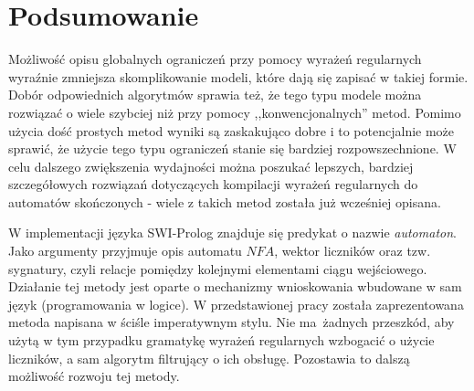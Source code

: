 \chapter{Podsumowanie}
\thispagestyle{chapterBeginStyle}

\par
Możliwość opisu globalnych ograniczeń przy pomocy wyrażeń regularnych wyraźnie zmniejsza skomplikowanie modeli, które
dają się zapisać w takiej formie. Dobór odpowiednich algorytmów sprawia też, że tego typu modele można rozwiązać o wiele
szybciej niż przy pomocy ,,konwencjonalnych'' metod. Pomimo użycia dość prostych metod wyniki są zaskakująco dobre i to
potencjalnie może sprawić, że użycie tego typu ograniczeń stanie się bardziej rozpowszechnione. W celu dalszego zwiększenia
wydajności można poszukać lepszych, bardziej szczegółowych rozwiązań dotyczących kompilacji wyrażeń regularnych do automatów
skończonych - wiele z takich metod została już wcześniej opisana.
\par
W implementacji języka SWI-Prolog znajduje się predykat o nazwie \textit{automaton}. Jako argumenty przyjmuje opis automatu $NFA$,
wektor liczników oraz tzw. sygnatury, czyli relacje pomiędzy kolejnymi elementami ciągu wejściowego. Działanie tej metody
jest oparte o mechanizmy wnioskowania wbudowane w sam język (programowania w logice). W przedstawionej pracy została
zaprezentowana metoda napisana w ściśle imperatywnym stylu. Nie ma żadnych przeszkód, aby użytą w tym przypadku gramatykę
wyrażeń regularnych wzbogacić o użycie liczników, a sam algorytm filtrujący o ich obsługę. Pozostawia to dalszą możliwość
rozwoju tej metody.
